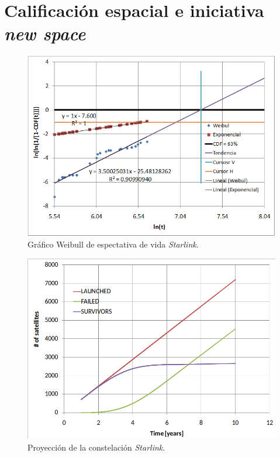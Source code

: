 \section{Calificación espacial e iniciativa \emph{new space}}
\label{sec:newspace}

\begin{figure}[htbp]
	\centering
	\includegraphics[width=.8\textwidth]{./Figures/starlinkdeath.png}
    \caption{Gráfico Weibull de espectativa de vida \emph{Starlink}\citep{ARTICLE:cibils}.}
	\label{fig:starlinkdeath}
\end{figure}

\begin{figure}[htbp]
	\centering
	\includegraphics[width=.8\textwidth]{./Figures/starlinkpopulation.png}
    \caption{Proyección de la constelación \emph{Starlink}\citep{ARTICLE:cibils}.}
	\label{fig:starlinkdeath}
\end{figure}

